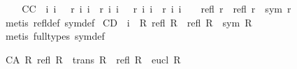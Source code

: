 \begin{isabellebody}
%
\isadelimproof
\ %
\endisadelimproof
%
\isatagproof
{}\isamarkupfalse%
\ %
%
\endisatagproof
{\isafoldproof}%
%
\isadelimproof
\isanewline
%
\endisadelimproof
{}\isamarkupfalse%
\ C{}{}{\isacharunderscore}C{\isacharcolon}\ {\isachardoublequoteopen}{\isacharhash}\ i{}\ i{}\ \ {\isasymand}\ r\ i{}\ i{}\ {\isasymand}\ r\ i{}\ i{}\ {\isasymand}\ {\isasymnot}\ r\ i{}\ i{}\ {\isasymand}\ r\ i{}\ i{}\ \ {\isasymlongrightarrow}\ {\isasymnot}\ {\isacharparenleft}refl\ r\ {\isasymlongrightarrow}\ {\isacharparenleft}refl\ r\ {\isasymand}\ sym\ r{\isacharparenright}{\isacharparenright}{\isachardoublequoteclose}\ \isanewline
%
\isadelimproof
\ %
\endisadelimproof
%
\isatagproof
{}\isamarkupfalse%
\ {\isacharparenleft}metis\ refl{\isacharunderscore}def\ sym{\isacharunderscore}def{\isacharparenright}%
\endisatagproof
{\isafoldproof}%
%
\isadelimproof
\isanewline
%
\endisadelimproof
{}\isamarkupfalse%
\ C{}{}{\isacharunderscore}D{\isacharcolon}\ {\isachardoublequoteopen}{\isacharhash}\ i{}\ {\isasymlongrightarrow}\ {\isacharparenleft}{\isasymforall}R{\isachardot}\ refl\ R\ {\isasymlongrightarrow}\ {\isacharparenleft}refl\ R\ {\isasymand}\ sym\ R{\isacharparenright}{\isacharparenright}{\isachardoublequoteclose}%
\isadelimproof
\ %
\endisadelimproof
%
\isatagproof
{}\isamarkupfalse%
\ {\isacharparenleft}metis\ {\isacharparenleft}full{\isacharunderscore}types{\isacharparenright}\ sym{\isacharunderscore}def{\isacharparenright}%
\endisatagproof
{\isafoldproof}%
%
\isadelimproof
%
\endisadelimproof
%
\begin{isamarkuptext}%
\begin{isbfig}{7em}
\end{isbfig}%
\end{isamarkuptext}%
\isamarkuptrue%
%
\isamarkuptrue%
\isamarkupfalse%
\ C{}{}{\isacharunderscore}A{\isacharcolon}\ {\isachardoublequoteopen}{\isasymforall}R{\isachardot}\ refl\ R\ {\isasymand}\ trans\ R\ {\isasymlongrightarrow}\ {\isacharparenleft}refl\ R\ {\isasymand}\ eucl\ R{\isacharparenright}{\isachardoublequoteclose}\isanewline

\end{isabellebody}
